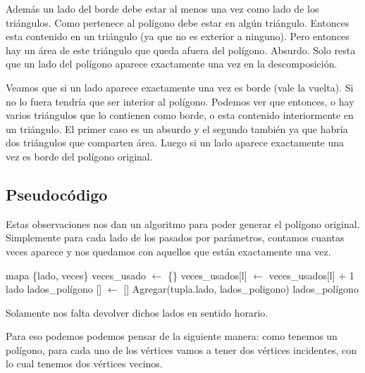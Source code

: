 \par{Además un lado del borde debe estar al menos una vez como lado de los triángulos. Como pertenece al polígono debe estar en algún triángulo. Entonces esta contenido en un triángulo (ya que no es exterior a ninguno). Pero entonces hay un área de este triángulo que queda afuera del polígono. Absurdo. Solo resta que un lado del polígono aparece exactamente una vez en la descomposición.}\newline

\par{Veamos que si un lado aparece exactamente una vez es borde (vale la vuelta). Si no lo fuera tendría que ser interior al polígono. Podemos ver que entonces, o hay varios triángulos que lo contienen como borde, o esta contenido interiormente en un triángulo. El primer caso es un absurdo y el segundo también ya que habría dos triángulos que comparten área. Luego si un lado aparece exactamente una vez es borde del polígono original.}

\subsection{Pseudocódigo}

Estas observaciones nos dan un algoritmo para poder generar el polígono original. Simplemente para cada lado de los pasados por parámetros, contamos cuantas veces aparece y nos quedamos con aquellos que están exactamente una vez. \newline

\begin{algorithmic}

	\State mapa \{lado, veces\} veces_usado $\gets$ \{\}
			\State veces_usados[l] $\gets$ veces_usados[l] + 1
		\EndFor
	\EndFor 
	\State lado lados_polígono [] $\gets$ []
			\State Agregar(tupla.lado, lados_poligono)
		\EndIf
	\EndFor
	\State \Return lados_polígono
\EndFunction

\end{algorithmic}

Solamente nos falta devolver dichos lados en sentido horario.\newline

Para eso podemos podemos pensar de la siguiente manera: como tenemos un polígono, para cada uno de los vértices vamos a tener dos vértices incidentes, con lo cual tenemos dos vértices vecinos.\newline

